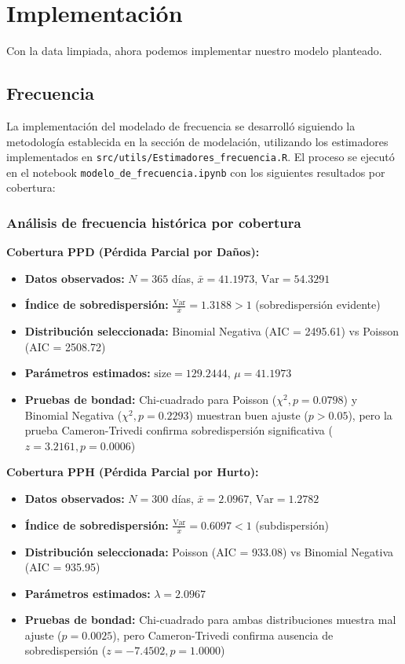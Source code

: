 \section{Implementación}

Con la data limpiada, ahora podemos implementar nuestro modelo planteado.

\subsection{Frecuencia}

La implementación del modelado de frecuencia se desarrolló siguiendo la metodología establecida en la sección de modelación, utilizando los estimadores implementados en \texttt{src/utils/Estimadores\_frecuencia.R}. El proceso se ejecutó en el notebook \texttt{modelo\_de\_frecuencia.ipynb} con los siguientes resultados por cobertura:

\subsubsection{Análisis de frecuencia histórica por cobertura}

\textbf{Cobertura PPD (Pérdida Parcial por Daños):}
\begin{itemize}
    \item \textbf{Datos observados:} $N = 365$ días, $\bar{x} = 41.1973$, $\text{Var} = 54.3291$
    \item \textbf{Índice de sobredispersión:} $\frac{\text{Var}}{\bar{x}} = 1.3188 > 1$ (sobredispersión evidente)
    \item \textbf{Distribución seleccionada:} Binomial Negativa (AIC = 2495.61) vs Poisson (AIC = 2508.72)
    \item \textbf{Parámetros estimados:} $\text{size} = 129.2444$, $\mu = 41.1973$
    \item \textbf{Pruebas de bondad:} Chi-cuadrado para Poisson ($\chi^2, p = 0.0798$) y Binomial Negativa ($\chi^2, p = 0.2293$) muestran buen ajuste ($p > 0.05$), pero la prueba Cameron-Trivedi confirma sobredispersión significativa ($z = 3.2161, p = 0.0006$)
\end{itemize}

\textbf{Cobertura PPH (Pérdida Parcial por Hurto):}
\begin{itemize}
    \item \textbf{Datos observados:} $N = 300$ días, $\bar{x} = 2.0967$, $\text{Var} = 1.2782$
    \item \textbf{Índice de sobredispersión:} $\frac{\text{Var}}{\bar{x}} = 0.6097 < 1$ (subdispersión)
    \item \textbf{Distribución seleccionada:} Poisson (AIC = 933.08) vs Binomial Negativa (AIC = 935.95)
    \item \textbf{Parámetros estimados:} $\lambda = 2.0967$
    \item \textbf{Pruebas de bondad:} Chi-cuadrado para ambas distribuciones muestra mal ajuste ($p = 0.0025$), pero Cameron-Trivedi confirma ausencia de sobredispersión ($z = -7.4502, p = 1.0000$)
\end{itemize}

